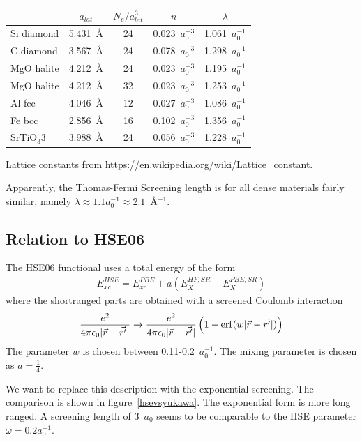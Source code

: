 \documentclass[11pt,a4paper]{report}
\begin{document}
\begin{center}
\begin{tabular}{|l|cccc|}
\hline
    & $a_{lat}$ &  $N_{e}/a_{lat}^3$ & $n$ & $\lambda$\\
\hline
Si diamond & 5.431~\AA & 24   & 0.023~$a_0^{-3}$ & 1.061~$a_0^{-1}$\\
C diamond &  3.567~\AA & 24   & 0.078~$a_0^{-3}$ & 1.298~$a_0^{-1}$\\
MgO halite & 4.212~\AA & 24   & 0.023~$a_0^{-3}$ & 1.195~$a_0^{-1}$\\
MgO halite & 4.212~\AA & 32   & 0.023~$a_0^{-3}$ & 1.253~$a_0^{-1}$\\
Al fcc     & 4.046~\AA & 12   & 0.027~$a_0^{-3}$ & 1.086~$a_0^{-1}$\\
Fe bcc     & 2.856~\AA & 16   & 0.102~$a_0^{-3}$ & 1.356~$a_0^{-1}$\\
SrTiO$_3$3 & 3.988~\AA & 24   & 0.056~$a_0^{-3}$ & 1.228~$a_0^{-1}$\\
\hline
\end{tabular}
\end{center}
Lattice constants from
\url{https://en.wikipedia.org/wiki/Lattice_constant}.

Apparently, the Thomas-Fermi Screening length is for all dense
materials fairly similar, namely $\lambda\approx1.1 a_0^{-1}\approx
2.1$~\AA$^{-1}$.


\subsection{Relation to HSE06}

The HSE06 functional uses a total energy of the form
\begin{eqnarray}
E^{HSE}_{xc}=E_{xc}^{PBE}+a\left(E_X^{HF,SR}-E_X^{PBE,SR}\right)
\end{eqnarray}
where the shortranged parts are obtained with a screened Coulomb
interaction
\begin{eqnarray}
\frac{e^2}{4\pi\epsilon_0|\vec{r}-\vec{r'}|}
\rightarrow
\frac{e^2}{4\pi\epsilon_0|\vec{r}-\vec{r'}|}
\left(1-{\rm erf}(w|\vec{r}-\vec{r'}|)\right)
\end{eqnarray}
The parameter $w$ is chosen between 0.11-0.2~$a_0^{-1}$. The mixing
parameter is chosen as $a=\frac{1}{4}$.

We want to replace this description with the exponential screening.
The comparison is shown in figure~\ref{hsevsyukawa}. The exponential
form is more long ranged. A screening length of 3~$a_0$ seems to be
comparable to the HSE parameter $\omega=0.2 a_0^{-1}$.
\end{document}
